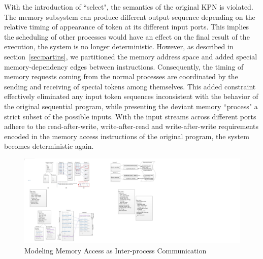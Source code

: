 With the introduction of ``select", the semantics of the original KPN is violated.
The memory subsystem can produce different output sequence depending on
the relative timing of appearance of token at its different input ports. 
This implies the scheduling of other processes would have an effect on the final
result of the execution, the system is no longer deterministic. 
However, as described in section~\ref{sec:partins}, we partitioned the memory
address space and added special memory-dependency edges between instructions. Consequently, the timing of memory requests coming from the normal processes are coordinated by the sending and receiving of special tokens among themselves.  This added constraint effectively eliminated any input token
sequences inconsistent with the behavior of the original sequential program,
while presenting the deviant memory ``process" a strict subset of the possible inputs. 
With the input streams across
different ports adhere to the read-after-write, write-after-read and write-after-write requirements encoded in the memory access instructions of the original program, the system becomes deterministic again. 

\begin{figure}[htp]
\begin{center}
\includegraphics[width=0.85\linewidth]{chap4fig/memProcess.pdf}
\caption{Modeling Memory Access as Inter-process Communication
\label{fig:memproc}}
\end{center}
\end{figure}

